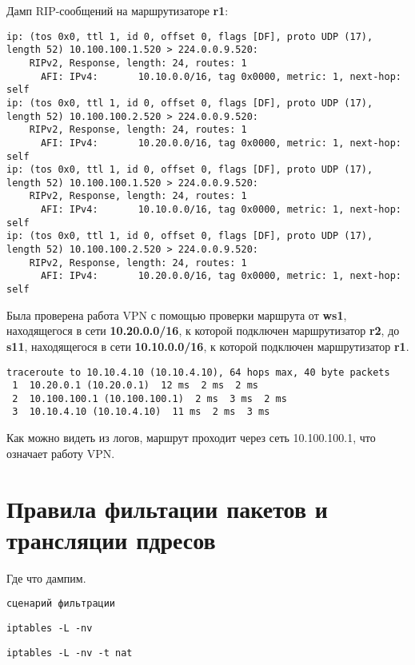 \documentclass[a4paper,12pt]{article}
\begin{document}
Дамп RIP-сообщений на маршрутизаторе \textbf{r1}:
\begin{Verbatim}
ip: (tos 0x0, ttl 1, id 0, offset 0, flags [DF], proto UDP (17), length 52) 10.100.100.1.520 > 224.0.0.9.520: 
	RIPv2, Response, length: 24, routes: 1
	  AFI: IPv4:       10.10.0.0/16, tag 0x0000, metric: 1, next-hop: self
ip: (tos 0x0, ttl 1, id 0, offset 0, flags [DF], proto UDP (17), length 52) 10.100.100.2.520 > 224.0.0.9.520: 
	RIPv2, Response, length: 24, routes: 1
	  AFI: IPv4:       10.20.0.0/16, tag 0x0000, metric: 1, next-hop: self
ip: (tos 0x0, ttl 1, id 0, offset 0, flags [DF], proto UDP (17), length 52) 10.100.100.1.520 > 224.0.0.9.520: 
	RIPv2, Response, length: 24, routes: 1
	  AFI: IPv4:       10.10.0.0/16, tag 0x0000, metric: 1, next-hop: self
ip: (tos 0x0, ttl 1, id 0, offset 0, flags [DF], proto UDP (17), length 52) 10.100.100.2.520 > 224.0.0.9.520: 
	RIPv2, Response, length: 24, routes: 1
	  AFI: IPv4:       10.20.0.0/16, tag 0x0000, metric: 1, next-hop: self
\end{Verbatim}

Была проверена работа VPN с помощью проверки маршрута от \textbf{ws1}, находящегося в сети \textbf{10.20.0.0/16}, к которой подключен маршрутизатор \textbf{r2}, до \textbf{s11}, находящегося в сети \textbf{10.10.0.0/16}, к которой подключен маршрутизатор \textbf{r1}. 
\begin{Verbatim}
traceroute to 10.10.4.10 (10.10.4.10), 64 hops max, 40 byte packets
 1  10.20.0.1 (10.20.0.1)  12 ms  2 ms  2 ms
 2  10.100.100.1 (10.100.100.1)  2 ms  3 ms  2 ms
 3  10.10.4.10 (10.10.4.10)  11 ms  2 ms  3 ms
\end{Verbatim}

Как можно видеть из логов, маршрут проходит через сеть 10.100.100.1, что означает работу VPN.

\section{Правила фильтации пакетов и трансляции пдресов}

Где что дампим. 

\begin{Verbatim}
сценарий фильтрации
\end{Verbatim}

\begin{Verbatim}
iptables -L -nv
\end{Verbatim}

\begin{Verbatim}
iptables -L -nv -t nat
\end{Verbatim}
\end{document}

